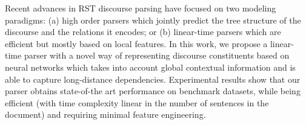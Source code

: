 Recent advances in RST discourse parsing have focused on two modeling paradigms: (a) high order parsers which jointly predict the tree structure of the discourse and the relations it encodes; or                                (b) linear-time parsers which are efficient but mostly based on local features.  In this work, we propose a linear-time parser with a novel way of representing discourse constituents based on neural networks which takes into account global contextual information and is able to capture long-distance dependencies. Experimental results show that our parser obtains state-of-the art performance on benchmark datasets, while being efficient (with time complexity linear in the number of sentences in the document) and requiring minimal feature engineering.
